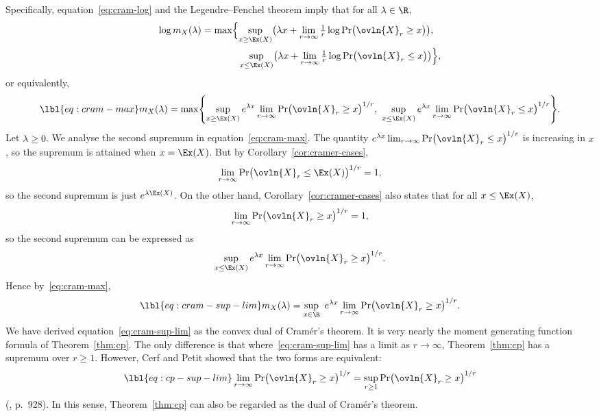 Specifically, equation~\eqref{eq:cram-log} and the Legendre--Fenchel
theorem imply that for all $\lambda \in \R$,
% 
\begin{align*}
\log m_X(\lambda)       
& = 
\max \Bigl\{
\sup_{x \geq \Ex(X)} \bigl(
\lambda x + \lim_{r \to \infty} \tfrac{1}{r} \log 
\Pr\bigl(\ovln{X}_r \geq x\bigr)
\bigr),\\
& \qquad\qquad\!\sup_{x \leq \Ex(X)} \bigl(
\lambda x + \lim_{r \to \infty} \tfrac{1}{r} \log 
\Pr\bigl(\ovln{X}_r \leq x\bigr)
\bigr)
\Bigr\},
\end{align*}
% 
or equivalently,
% 
\begin{equation}
\lbl{eq:cram-max}
m_X(\lambda)
=
\max \Biggl\{
\sup_{x \geq \Ex(X)} 
e^{\lambda x} \lim_{r \to \infty} 
\Pr\bigl(\ovln{X}_r \geq x\bigr)^{1/r},
\
\sup_{x \leq \Ex(X)} 
e^{\lambda x} \lim_{r \to \infty} 
\Pr\bigl(\ovln{X}_r \leq x\bigr)^{1/r}
\Biggr\}.
\end{equation}
% 
Let $\lambda \geq 0$.  We analyse the second supremum in
equation~\eqref{eq:cram-max}.  The quantity $e^{\lambda x} \lim_{r \to
  \infty} \Pr\bigl(\ovln{X}_r \leq x\bigr)^{1/r}$ is increasing in $x$, so
the supremum is attained when $x = \Ex(X)$.  But by
Corollary~\ref{cor:cramer-cases},
\[
\lim_{r \to \infty} 
\Pr\bigl(
\ovln{X}_r \leq \Ex(X)
\bigr)^{1/r}
=
1,
\]
so the second supremum is just $e^{\lambda\Ex(X)}$.  On the other hand,
Corollary~\ref{cor:cramer-cases}\bref{part:cramer-cases-1} also states that
for all $x \leq \Ex(X)$, 
\[
\lim_{r \to \infty} 
\Pr\bigl(
\ovln{X}_r \geq x
\bigr)^{1/r}
=
1,
\]
so the second supremum can be expressed as
\[
\sup_{x \leq \Ex(X)} e^{\lambda x} 
\lim_{r \to \infty} \Pr\bigl(\ovln{X}_r \geq x\bigr)^{1/r}.
\]
Hence by~\eqref{eq:cram-max},
% 
\begin{equation}
\lbl{eq:cram-sup-lim}
m_X(\lambda)
=
\sup_{x \in \R} \ e^{\lambda x} \lim_{r \to \infty} 
\Pr\bigl(\ovln{X}_r \geq x\bigr)^{1/r}.
\end{equation}
% 
We have derived equation~\eqref{eq:cram-sup-lim} as the convex dual of
Cram\'er's theorem.  It is very nearly the moment generating function
formula of Theorem~\ref{thm:cp}.  The only difference is that
where~\eqref{eq:cram-sup-lim} has a limit as $r \to \infty$,
Theorem~\ref{thm:cp} has a supremum over $r \geq 1$.  However, Cerf and
Petit showed that the two forms are equivalent:
% 
\begin{equation}
\lbl{eq:cp-sup-lim}
\lim_{r \to \infty} \Pr\bigl(\ovln{X}_r \geq x\bigr)^{1/r}
=
\sup_{r \geq 1} \Pr\bigl(\ovln{X}_r \geq x\bigr)^{1/r}
\end{equation}
% 
(\cite{CePe}, p.~928).  In this sense, Theorem~\ref{thm:cp} can also be
regarded as the dual of Cram\'er's theorem.

